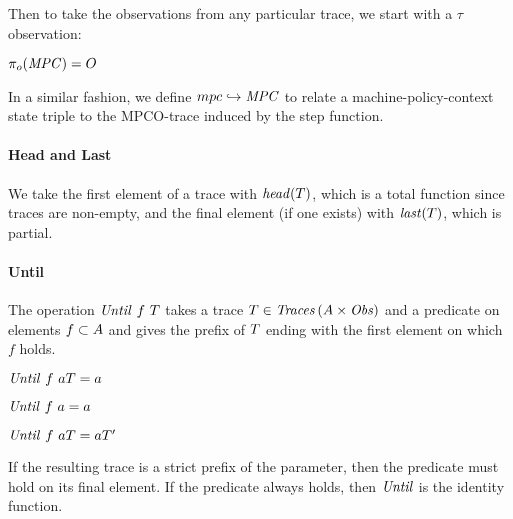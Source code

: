 \documentclass[acmsmall,review,anonymous]{acmart}\settopmatter{printfolios=true,printccs=false,printacmref=false}
\begin{document}
Then to take the observations from any particular trace, we start with a \(\tau\) observation:

         {\(\pi_o(\mathit{MPC}) = O\)}
\noindent

In a similar fashion, we define \(mpc \hookrightarrow \mathit{MPC}\)
to relate a machine-policy-context state triple to the MPCO-trace
induced by the step function.

\paragraph*{Head and Last}

We take the first element of a trace with \(\mathit{head}(T)\), which is a total
function since traces are non-empty, and the final element (if one exists) with
\(\mathit{last}(T)\), which is partial.

\paragraph*{Until}
The operation \(\mathit{Until} ~ f ~ T\) takes a trace
\(T \in \mathit{Traces}\,(A \times \mathit{Obs})\) and a predicate
on elements \(f \subset A\) and gives the prefix of
\(T\) ending with the first element on which \(f\) holds.

\begin{center}
  \begin{minipage}{.3\textwidth}
             {\(\mathit{Until} ~ f ~ aT = a\)}
  \end{minipage}
%
  \begin{minipage}{.3\textwidth}
    \judgment{}
             {\(\mathit{Until} ~ f ~ a = a\)}
%
  \end{minipage}
  \begin{minipage}{.3\textwidth}
                {\(\mathit{Until} ~ f ~ aT = aT'\)}
  \end{minipage}
\end{center}
%
If the resulting trace is a strict prefix of the parameter, then the
predicate must hold on its final element. If the predicate always holds, then
\(\mathit{Until}\) is the identity function.

\end{document}
